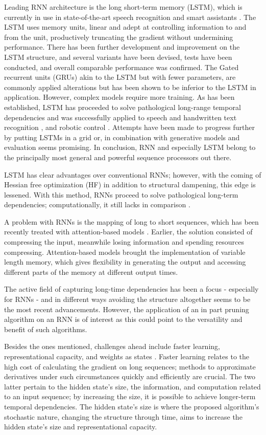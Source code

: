 Leading RNN architecture is the long short-term memory \cite{LSTM} (LSTM), which is currently in use in state-of-the-art speech recognition and smart assistants \cite{Apple}. The LSTM uses memory units, linear and adept at controlling information to and from the unit, productively truncating the gradient without undermining performance. There has been further development and improvement on the LSTM structure, and several variants have been devised, tests have been conducted, and overall comparable performance was confirmed\cite{Greff}. The Gated recurrent units (GRUs) akin to the LSTM but with fewer parameters, are commonly applied alterations but has been shown to be inferior to the LSTM in application. However, complex models require more training. As has been established, LSTM has proceeded to solve pathological long-range temporal dependencies and was successfully applied to speech and handwritten text recognition \cite{gs, gas}, and robotic control \cite{mayer}. Attempts have been made to progress further by putting LSTMs in a grid\cite{ka} or, in combination with generative models and evaluation seems promising\cite{gr, ch, bo}. In conclusion, RNN and especially LSTM belong to the principally most general and powerful sequence processors out there.

LSTM has clear advantages over conventional RNNs; however, with the coming of Hessian free optimization (HF) in addition to structural dampening, this edge is lessened. With this method, RNNs proceed to solve pathological long-term dependencies; computationally, it still lacks in comparison \cite{suts}. 

A problem with RNNs is the mapping of long to short sequences, which has been recently treated with attention-based models \cite{xu}. Earlier, the solution consisted of compressing the input, meanwhile losing information and spending resources compressing. Attention-based models brought the implementation of variable length memory, which gives flexibility in generating the output and accessing different parts of the memory at different output times. 

The active field of capturing long-time dependencies has been a focus - especially for RNNs - and in different ways avoiding the structure altogether seems to be the most recent advancements. However, the application of an in part pruning algorithm on an RNN is of interest as this could point to the versatility and benefit of such algorithms.

Besides the ones mentioned, challenges ahead include faster learning, representational capacity, and weights as states \cite{suts}. Faster learning relates to the high cost of calculating the gradient on long sequences; methods to approximate derivatives under such circumstances quickly and efficiently are crucial. The two latter pertain to the hidden state's size, the information, and computation related to an input sequence; by increasing the size, it is possible to achieve longer-term temporal dependencies. The hidden state's size is where the proposed algorithm's stochastic nature, changing the structure through time, aims to increase the hidden state's size and representational capacity.

